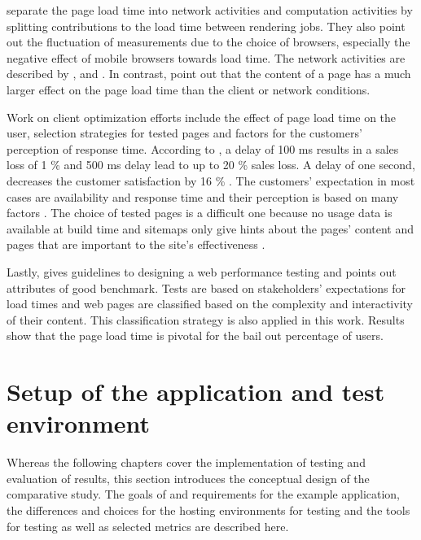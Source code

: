 \documentclass[a4paper, 12pt]{article}
\begin{document}
\cite{whatifanalysis} separate the page load time into network activities and computation activities by splitting contributions to the load time between rendering jobs.
They also point out the fluctuation of measurements due to the choice of browsers, especially the negative effect of mobile browsers towards load time.
The network activities are described by \cite{webprophet}, \cite{highperformancebrowsernetworking} and \cite{measuringandmitigatinwebperformance}.
In contrast, \cite{effectsofwebpagecontents} point out that the content of a page has a much larger effect on the page load time than the client or network conditions. 

Work on client optimization efforts include the effect of page load time on the user, selection strategies for tested pages and factors for the customers' perception of response time.
According to \cite{webprophet}, a delay of 100 ms results in a sales loss of 1 \% and 500 ms delay lead to up to 20 \% sales loss.
A delay of one second, decreases the customer satisfaction by 16 \% \citep{effectsofwebpagecontents}.
The customers' expectation in most cases are availability and response time and their perception is based on many factors \citep{loadtestingofwebsites}.
The choice of tested pages is a difficult one because no usage data is available at build time and sitemaps only give hints about the pages' content and pages that are important to the site's effectiveness \citep{onlandingandinternalwebpages}. 

Lastly, \cite{integratedapproach} gives guidelines to designing a web performance testing and points out attributes of good benchmark.
Tests are based on stakeholders' expectations for load times and web pages are classified based on the complexity and interactivity of their content.
This classification strategy is also applied in this work.
Results show that the page load time is pivotal for the bail out percentage of users.

\section{Setup of the application and test environment}\label{sec:design}

Whereas the following chapters cover the implementation of testing and evaluation of results, this section introduces the conceptual design of the comparative study.
The goals of and requirements for the example application, the differences and choices for the hosting environments for testing and the tools for testing as well as selected metrics are described here.
\end{document}
